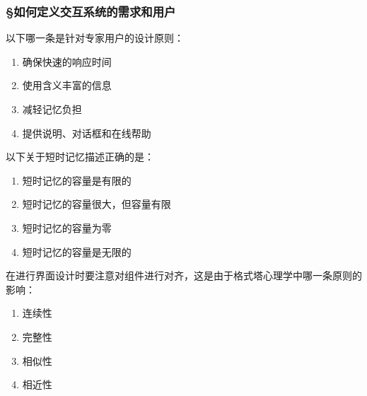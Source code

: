 \subsubsection*{\S 如何定义交互系统的需求和用户}
\setcounter{problemname}{0}

\begin{problem}
	‌以下哪一条是针对专家用户的设计原则：
    \vspace{-0.8em}
    \begin{multicols}{2}
        \begin{enumerate}[label=\Alph*.]
            \item 确保快速的响应时间
            \item 使用含义丰富的信息
            \item 减轻记忆负担
            \item 提供说明、对话框和在线帮助
        \end{enumerate}
    \end{multicols}
    \vspace{-1em}
\end{problem}



\begin{problem}
	以下关于短时记忆描述正确的是：  
    \vspace{-0.8em}
    \begin{multicols}{2}
        \begin{enumerate}[label=\Alph*.]
            \item 短时记忆的容量是有限的
            \item 短时记忆的容量很大，但容量有限
            \item 短时记忆的容量为零
            \item 短时记忆的容量是无限的
        \end{enumerate}
    \end{multicols}
    \vspace{-1em}
\end{problem}



\begin{problem}
	在进行界面设计时要注意对组件进行对齐，这是由于格式塔心理学中哪一条原则的影响：
    \vspace{-0.8em}
    \begin{multicols}{4}
        \begin{enumerate}[label=\Alph*.]
            \item 连续性
            \item 完整性
            \item 相似性
            \item 相近性
        \end{enumerate}
    \end{multicols}
    \vspace{-1em}
\end{problem}



